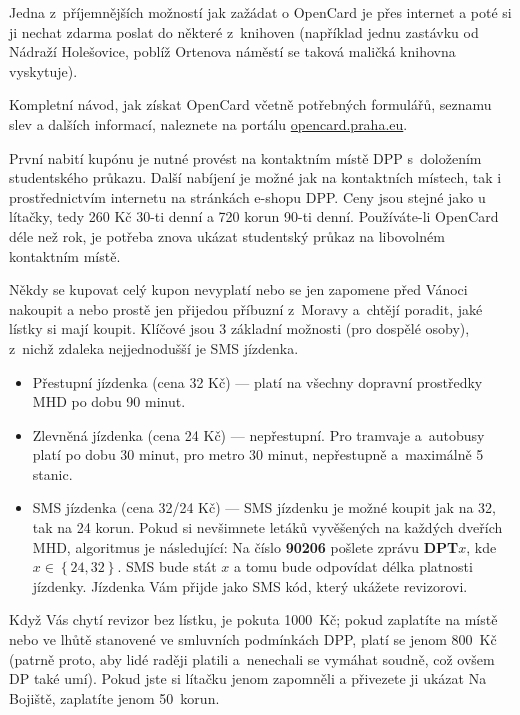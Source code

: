 Jedna z~příjemnějších možností jak zažádat o OpenCard je přes internet a poté si ji nechat zdarma poslat do některé z~knihoven (například jednu zastávku od Nádraží Holešovice, poblíž Ortenova náměstí se taková maličká knihovna vyskytuje).

Kompletní návod, jak získat OpenCard včetně potřebných formulářů, seznamu slev a dalších informací, naleznete na portálu \url{opencard.praha.eu}.

První nabití kupónu je nutné provést na kontaktním místě DPP s~doložením studentského průkazu. Další nabíjení je možné jak na kontaktních místech, tak i prostřednictvím internetu na stránkách e-shopu DPP. Ceny jsou stejné jako u lítačky, tedy 260 Kč 30-ti denní a 720 korun 90-ti denní. Používáte-li OpenCard déle než rok, je potřeba znova ukázat studentský průkaz na libovolném kontaktním místě.


Někdy se kupovat celý kupon nevyplatí nebo se jen zapomene před
Vánoci nakoupit a nebo prostě jen přijedou příbuzní z~Moravy
a~chtějí poradit, jaké lístky si mají koupit. Klíčové jsou 3
základní možnosti (pro dospělé osoby), z~nichž zdaleka nejjednodušší je SMS jízdenka.

\begin{itemize}

\item Přestupní jízdenka (cena 32 Kč) --- platí na všechny dopravní
prostředky MHD po dobu 90 minut.

\item Zlevněná jízdenka (cena 24 Kč) --- nepřestupní. Pro tramvaje
a~autobusy platí po dobu 30 minut, pro metro 30 minut, nepřestupně
a~maximálně 5 stanic.

\item SMS jízdenka (cena 32/24 Kč) --- SMS jízdenku je možné koupit jak na 32, tak na 24 korun. Pokud si nevšimnete letáků vyvěšených na každých dveřích MHD, algoritmus je následující: Na číslo {\bf 90206} pošlete zprávu {\bf DPT$x$}, kde $x\in\left\{24, 32\right\}$. SMS bude stát $x$ a tomu bude odpovídat délka platnosti jízdenky. Jízdenka Vám přijde jako SMS kód, který ukážete revizorovi.

\end{itemize}

Když Vás chytí revizor bez lístku, je pokuta 1000~Kč; pokud
zaplatíte na místě nebo ve lhůtě stanovené ve smluvních podmínkách
DPP, platí se jenom 800~Kč (patrně proto, aby lidé raději platili
a~nenechali se vymáhat soudně, což ovšem DP také umí). Pokud jste
si lítačku jenom zapomněli a přivezete ji ukázat Na Bojiště,
zaplatíte jenom 50~korun.

